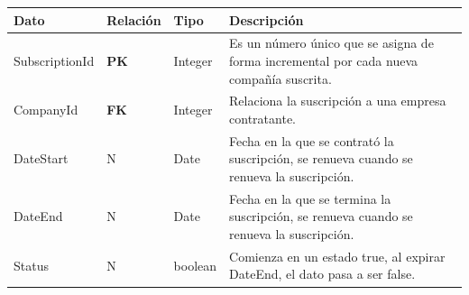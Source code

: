 \documentclass[12pt]{article}
\begin{document}
\begin{enumerate}
\begin{table}[!h]
\begin{tabular}{|p{3cm}|p{2cm}|p{2.5cm}|p{8cm}|}
             \hline
             \textbf{Dato} & \textbf{Relación} & \textbf{Tipo} & \textbf{Descripción} \\
             \hline
             SubscriptionId & \textbf{PK} & Integer & Es un número único que se asigna de forma incremental por cada nueva compañía suscrita. \\
             \hline
             CompanyId & \textbf{FK} & Integer & Relaciona la suscripción a una empresa contratante. \\
             \hline
             DateStart & N & Date & Fecha en la que se contrató la suscripción, se renueva cuando se renueva la suscripción. \\
             \hline
             DateEnd & N & Date & Fecha en la que se termina la suscripción, se renueva cuando se renueva la suscripción. \\
             \hline
             Status & N & boolean & Comienza en un estado true, al expirar DateEnd, el dato pasa a ser false. \\
             \hline
        \end{tabular}
    \end{table}


\end{enumerate}
\end{document}
